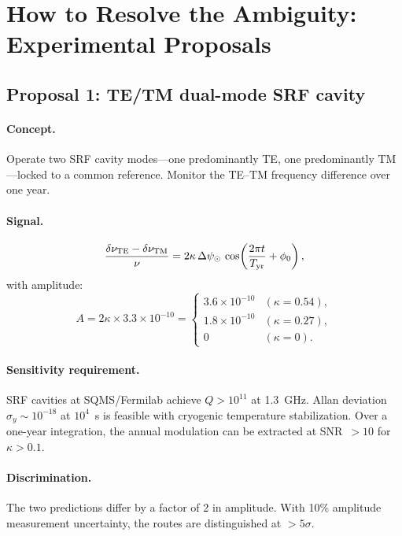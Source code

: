 \documentclass[11pt,a4paper]{article}
\theoremstyle{definition}
\begin{document}
\section{How to Resolve the Ambiguity: Experimental Proposals}
\label{sec:proposals}

\subsection{Proposal 1: TE/TM dual-mode SRF cavity}

\paragraph{Concept.}
Operate two SRF cavity modes---one predominantly TE, one
predominantly TM---locked to a common reference.  Monitor the
TE--TM frequency difference over one year.

\paragraph{Signal.}
\begin{equation}
\frac{\delta\nu_{\rm TE} - \delta\nu_{\rm TM}}{\nu}
= 2\kappa\,\Delta\psi_\odot\,\cos\!\left(\frac{2\pi t}{T_{\rm yr}}
+ \phi_0\right),
\end{equation}
with amplitude:
\begin{equation}
A = 2\kappa \times 3.3 \times 10^{-10}
= \begin{cases}
3.6 \times 10^{-10} & (\kappa = 0.54), \\
1.8 \times 10^{-10} & (\kappa = 0.27), \\
0 & (\kappa = 0).
\end{cases}
\end{equation}

\paragraph{Sensitivity requirement.}
SRF cavities at SQMS/Fermilab achieve $Q > 10^{11}$ at 1.3~GHz.
Allan deviation $\sigma_y \sim 10^{-18}$ at $10^4$~s is feasible
with cryogenic temperature stabilization.  Over a one-year
integration, the annual modulation can be extracted at SNR~$>10$
for $\kappa > 0.1$.

\paragraph{Discrimination.}
The two predictions differ by a factor of 2 in amplitude.
With 10\% amplitude measurement uncertainty, the routes are
distinguished at $> 5\sigma$.
\end{document}
